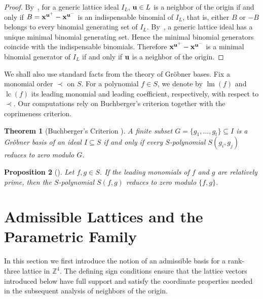 \documentclass[10pt,a4paper]{amsart}
\newtheorem{theorem}{Theorem}[section]
\newtheorem{proposition}[theorem]{Proposition}
\begin{document}
\begin{proof}
By~\cite[Theorem~2.2]{Sabzrou}, for a generic lattice ideal $I_L$,
${\bf u}\in L$ is a neighbor of the origin if and only if
$
B={\bf x}^{{\bf u}^{+}}-{\bf x}^{{\bf u}^{-}}$
is an indispensable binomial of $I_L$, that is, either $B$ or $-B$
belongs to every binomial generating set of $I_L$.
By~\cite[Remark~4.4(3)]{PS}, a generic lattice ideal has a unique
minimal binomial generating set. Hence the minimal binomial generators
coincide with the indispensable binomials. Therefore
$
{\bf x}^{{\bf u}^{+}}-{\bf x}^{{\bf u}^{-}}$ is a minimal binomial generator of $I_L$ if and only if
${\bf u}$ is a neighbor of the origin.
\end{proof}
We shall also use standard facts from the theory of Gr\"obner bases.
Fix a monomial order $\prec$ on $S$. For a polynomial $f\in S$, we
denote by $\operatorname{lm}(f)$ and $\operatorname{lc}(f)$ its
leading monomial and leading coefficient, respectively, with respect
to $\prec$. Our computations rely on Buchberger's criterion together
with the coprimeness criterion.

\begin{theorem}[Buchberger's Criterion {\cite[Chapter~2, \S6, Theorem~6]{CLO}}]
\label{thm:buchberger}
A finite subset $G=\{g_1,\ldots,g_t\}\subseteq I$
is a Gr\"obner basis of an ideal $I\subseteq S$ if and only if every
$S$-polynomial $S(g_i,g_j)$ reduces to zero modulo $G$.
\end{theorem}

\begin{proposition}[{\cite[Chapter~2, Proposition~4]{CLO}}]
\label{prop:coprime}
Let $f,g\in S$. If the leading monomials of $f$ and $g$ are relatively
prime, then the $S$-polynomial $S(f,g)$ reduces to zero modulo
$\{f,g\}$.
\end{proposition}

\section{Admissible Lattices and the Parametric Family}
\label{sec:setup}
In this section we first introduce the notion of an admissible basis
for a rank-three lattice in $\mathbb Z^4$. The defining sign
conditions ensure that the lattice vectors introduced below have full
support and satisfy the coordinate properties needed in the subsequent
analysis of neighbors of the origin.
\end{document}
